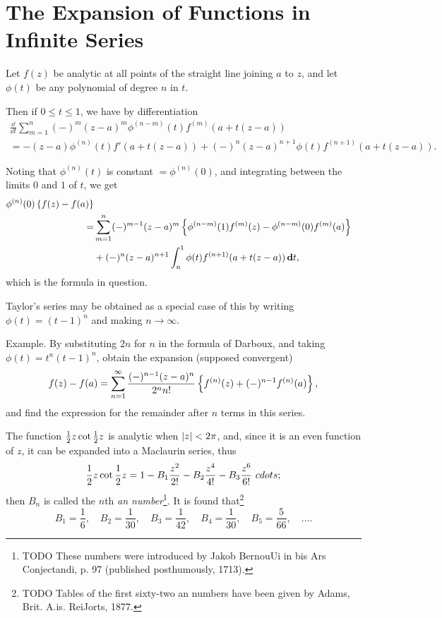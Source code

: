 %
%
\chapter{The Expansion of Functions in Infinite Series} 


Let $f(z)$ be analytic at all points of the straight line joining $a$
to $z$, and let $\phi(t)$ be any polynomial of degree $n$ in $t$.

Then if $0 \leq t \leq 1$, we have by differentiation
\begin{align*}
  \frac{\dd }{\dd t}
  \sum_{m=1}^{n} (-)^{m} (z-a)^{m} \phi^{(n-m)}(t) f^{(m)}(a + t(z-a))
  \\
  =
  -(z-a) \phi^{(n)}(t) f'(a + t(z-a))
  +
  (-)^{n} (z-a)^{n+1} \phi(t) f^{(n+1)}(a + t (z-a)).
\end{align*}

Noting that $\phi^{(n)}(t)$ is constant $= \phi^{(n)}(0)$, and integrating
between the limits $0$ and $1$ of $t$, we get
\begin{align*}
  \phi^{(n)}(0) \left\{  f(z) - f(a)  \right\}
  \\
  =&
  \sum_{m=1}^{n} (-)^{m-1} (z-a)^{m}
  \left\{ 
    \phi^{(n-m)}(1) f^{(m)}(z) - \phi^{(n-m)}(0) f^{(m)}(a)
   \right\}
  \\
  &
  + (-)^{n} (z-a)^{n+1}
  \int_{n}^{1} \phi(t) f^{(n+1)}(a + t(z-a)) \, \mathbf{d} t,
\end{align*}
which is the formula in question.

Taylor's series may be obtained as a special case of this by writing
$\phi(t) = (t-1)^{n}$ and making $n\rightarrow\infty$.

Example. By substituting $2n$ for $n$ in the formula of Darboux, and
taking $\phi(t) = t^{n} (t-1)^{n}$, obtain the expansion (supposed convergent)
$$
f(z) - f(a)
=
\sum_{n=1}^{\infty}
\frac{ (-)^{n-1} (z-a)^{n} }{2^{n} n!}
\left\{  f^{(n)}(z) + (-)^{n-1} f^{(n)}(a)  \right\},
$$
and find the expression for the remainder after $n$ terms in this
series.

The function $\frac{1}{2} z \cot \frac{1}{2} z$ is analytic when $\left| z \right| <
2\pi$,
and, since it is an even function of $z$, it can be expanded into a
Maclaurin series, thus
$$
\frac{1}{2} z \cot \frac{1}{2} z
=
1
- B_{1} \frac{z^{2}}{2!}
- B_{2} \frac{z^{4}}{4!}
- B_{3} \frac{z^{6}}{6!}
\ cdots
;
$$
then $B_{n}$ is called the $n$th \emph{\Bernoulli an
  number}\footnote{TODO These numbers were introduced by Jakob BernouUi in bis Ars
Conjectandi, p. 97 (published posthumously, 1713).}. 
It is found that\footnote{TODO Tables of the first sixty-two \Bernoulli an numbers have been given by
Adams, Brit. A.is. ReiJorts, 1877.}
$$
B_{1} = \frac{1}{6},
\quad
B_{2} = \frac{1}{30},
\quad
B_{3} = \frac{1}{42},
\quad
B_{4} = \frac{1}{30},
\quad
B_{5} = \frac{5}{66},
\quad
\ldots.
$$

